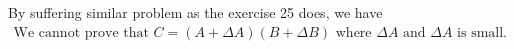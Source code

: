 \documentclass[11pt,a4paper]{article}
\begin{document}
\setcounter{section}{26}
\section{}
By suffering similar problem as the exercise 25 does, we have
    \begin{align}
        \text{We cannot prove that } C = (A + \Delta A) (B + \Delta B) 
        \text{ where } \Delta A \text{ and } \Delta A \text{ is small. } 
    \end{align}

\end{document}
